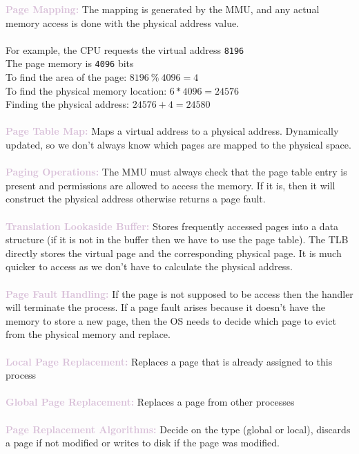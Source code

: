 \documentclass[a4paper,10pt]{article}
\begin{document}
\textcolor{Thistle}{\textbf{Page Mapping:}} The mapping is generated by the MMU, and any actual memory access is done with the physical address value. \\\\
For example, the CPU requests the virtual address \texttt{8196} \\ 
The page memory is \texttt{4096} bits \\ 
To find the area of the page: $8196 \ \% \ 4096 = 4$ \\
To find the physical memory location: $6 * 4096 = 24576$ \\
Finding the physical address: $24576 + 4 = 24580$ \\\\ 
\textcolor{Thistle}{\textbf{Page Table Map:}} Maps a virtual address to a physical address. Dynamically updated, so we don't always know which pages are mapped to the physical space. \\\\
\textcolor{Thistle}{\textbf{Paging Operations:}} The MMU must always check that the page table entry is present and permissions are allowed to access the memory. If it is, then it will construct the physical address otherwise returns a page fault. \\\\
\textcolor{Thistle}{\textbf{Translation Lookaside Buffer:}} Stores frequently accessed pages into a data structure (if it is not in the buffer then we have to use the page table). The TLB directly stores the virtual page and the corresponding physical page. It is much quicker to access as we don't have to calculate the physical address. \\\\ 
\textcolor{Thistle}{\textbf{Page Fault Handling:}} If the page is not supposed to be access then the handler will terminate the process. If a page fault arises because it doesn't have the memory to store a new page, then the OS needs to decide which page to evict from the physical memory and replace. \\\\
\textcolor{Thistle}{\textbf{Local Page Replacement:}} Replaces a page that is already assigned to this process \\\\
\textcolor{Thistle}{\textbf{Global Page Replacement:}} Replaces a page from other processes\\\\
\textcolor{Thistle}{\textbf{Page Replacement Algorithms:}} Decide on the type (global or local), discards a page if not modified or writes to disk if the page was modified.\\\\
\end{document}
